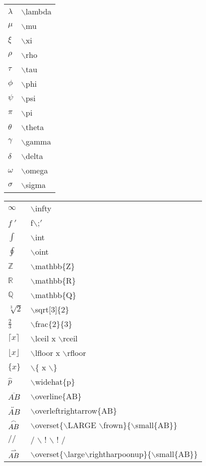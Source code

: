 \documentclass[10pt]{beamer}
\begin{document}
\begin{frame}
\begin{tabular}{ll}
$\lambda$ &  $\backslash$lambda \\
$\mu$ &  $\backslash$mu \\
$\xi$ &  $\backslash$xi \\
$\rho$ &  $\backslash$rho \\
$\tau$ &  $\backslash$tau \\
$\phi$ &  $\backslash$phi \\
$\psi$ &  $\backslash$psi \\
$\pi$ &  $\backslash$pi \\
$\theta$ &  $\backslash$theta \\
$\gamma$ &  $\backslash$gamma\\
$\delta$ &  $\backslash$delta \\
$\omega$ &  $\backslash$omega \\
$\sigma$ &  $\backslash$sigma \\
\end{tabular}
\hspace*{1ex}
\begin{tabular}{ll}
$\infty$ & $\backslash$infty \\
$f\;' $ &  f$\backslash$;$\prime$\\
$\int $ &  $\backslash$int \\
$\oint $ & $\backslash$oint \\
$\mathbb{Z} $ &  $\backslash$mathbb\{Z\} \\
$\mathbb{R} $ &  $\backslash$mathbb\{R\} \\
$\mathbb{Q} $ &  $\backslash$mathbb\{Q\} \\
$\sqrt[3]{2}$ & $\backslash$sqrt[3]\{2\} \\
$\frac{2}{3}$ & $\backslash$frac\{2\}\{3\} \\
$\lceil x \rceil$ & $\backslash$lceil x $\backslash$rceil \\
$\lfloor x \rfloor$ & $\backslash$lfloor x $\backslash$rfloor \\
$\{ x \}$ & $\backslash$\{ x $\backslash$\} \\
$\widehat{p} $ &  $\backslash$widehat\{p\} \\
$\overline{AB} $ &  $\backslash$overline\{AB\} \\
$\overleftrightarrow{AB} $ &  {\scriptsize $\backslash$overleftrightarrow\{AB\} }\\
$\overset{\LARGE\frown}{\small{AB}} $ &  {\scriptsize $\backslash$overset\{$\backslash$LARGE $\backslash$frown\}\{$\backslash$small\{AB\}\}}\\
$ /\!\! /$  &   / $\backslash$ ! $\backslash$ ! /\\
 $\overset{\large \rightharpoonup}{\small{AB}}$ & {\scriptsize
 $\backslash$overset\{$\backslash$large$\backslash$rightharpoonup\}\{$\backslash$small\{AB\}\} }
\end{tabular}

\end{frame}
\end{document}

